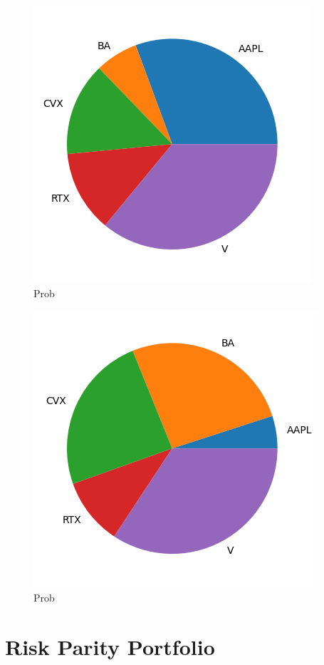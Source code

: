 \begin{figure}[h]
  \begin{center}
    \includegraphics[width=0.6\linewidth]{figures/replica_portfolio_weights}
  \end{center}
  \caption{Prob}
  \label{fig:replica_portfolio_weights}
\end{figure}

\begin{figure}[h]
  \begin{center}
    \includegraphics[width=0.6\linewidth]{figures/black_litterman_weights}
  \end{center}
  \caption{Prob}
  \label{fig:black_litterman_weights}
\end{figure}



\section{Risk Parity Portfolio}
\label{risk-parity-portfolio}

